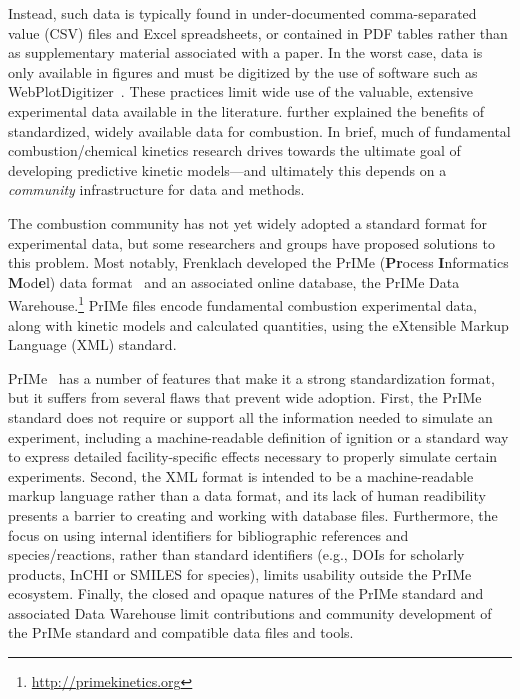 \documentclass[12pt]{ijck}
\begin{document}
Instead, such data is typically found in under-documented comma-separated value
(CSV) files and Excel spreadsheets, or contained in PDF tables rather than as
supplementary material associated with a paper. In the worst case, data is only
available in figures and must be digitized by the use of software such as
WebPlotDigitizer~\autocite{WebPlotDigitizer}. These practices limit wide use
of the valuable, extensive experimental data available in the literature.
\textcite{Frenklach:2007bm} further explained the benefits of standardized,
widely available data for combustion. In brief, much of fundamental
combustion\slash chemical kinetics research drives towards the ultimate goal of
developing predictive kinetic models---and ultimately this depends on a
\emph{community} infrastructure for data and methods.

The combustion community has not yet widely adopted a standard format for
experimental data, but some researchers and groups have proposed solutions to
this problem. Most notably, Frenklach developed the PrIMe (\textbf{Pr}ocess
\textbf{I}nformatics \textbf{M}od\textbf{e}l) data
format~\autocite{Frenklach:2007bm,You:2011hy} and an associated online database,
the PrIMe Data Warehouse.\footnote{\url{http://primekinetics.org}}
PrIMe files encode fundamental
combustion experimental data, along with kinetic models and calculated
quantities, using the eXtensible Markup Language (XML) standard.

PrIMe~\autocite{Frenklach:2007bm,You:2011hy} has a number of features that make
it a strong standardization format, but it suffers from several flaws that
prevent wide adoption. First, the PrIMe standard does not require or support all
the information needed to simulate an experiment, including a machine-readable
definition of ignition or a standard way to express detailed facility-specific
effects necessary to properly simulate certain experiments. Second, the XML
format is intended to be a machine-readable markup language rather than a data format, and
its lack of human readibility presents a barrier to creating and working with
database files. Furthermore, the
focus on using internal identifiers for bibliographic references and
species\slash reactions, rather than standard identifiers (e.g., DOIs for
scholarly products, InCHI or SMILES for species), limits usability outside
the PrIMe ecosystem. Finally, the closed and opaque natures of the PrIMe standard
and associated Data Warehouse limit contributions and community development of
the PrIMe standard and compatible data files and tools.
\end{document}
